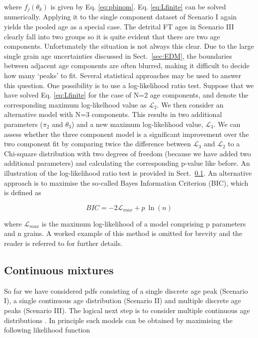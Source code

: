 \documentclass{article}
\begin{document}
where $f_j(\theta_k)$ is given by Eq. \ref{eq:pbinom}.  Eq.
\ref{eq:Lfinite} can be solved numerically. Applying it to the single
component dataset of Scenario I again yields the pooled age as a
special case. The detrital FT ages in Scenario III clearly fall into
two groups so it is quite evident that there are two age
components. Unfortunately the situation is not always this clear. Due
to the large single grain age uncertainties discussed in
Sect.~\ref{sec:EDM}, the boundaries between adjacent age components
are often blurred, making it difficult to decide how many `peaks' to
fit. Several statistical approaches may be used to answer this
question.  One possibility is to use a log-likelihood ratio
test. Suppose that we have solved Eq. \ref{eq:Lfinite} for the case of
N=2 age components, and denote the corresponding maximum log-likelhood
value as $\mathcal{L}_2$. We then consider an alternative model with
N=3 components.  This results in two additional parameters ($\pi_2$
and $\theta_3$) and a new maximum log-likelihood value,
$\mathcal{L}_3$. We can assess whether the three component model is a
significant improvement over the two component fit by comparing twice
the difference between $\mathcal{L}_3$ and $\mathcal{L}_2$ to a
Chi-square distribution with two degrees of freedom (because we have
added two additional parameters) and calculating the corresponding
p-value like before. An illustration of the log-likelihood ratio test
is provided in Sect.~\ref{sec:continuous}.  An alternative approach is
to maximise the so-called Bayes Information Criterion (BIC), which is
defined as

\begin{equation}
BIC = -2 \mathcal{L}_{max} + p ~ \ln (n)
\end{equation}

where $\mathcal{L}_{max}$ is the maximum log-likelihood of a model
comprising p parameters and n grains. A worked example of this method
is omitted for brevity and the reader is referred to
\citet[][p.91]{galbraith2005} for further details.

\subsection{Continuous mixtures}
\label{sec:continuous}

So far we have considered pdfs consisting of a single discrete age
peak (Scenario I), a single continuous age distribution (Scenario II)
and multiple discrete age peaks (Scenario III).  The logical next step
is to consider multiple continuous age distributions
\citep{jasra2006}.  In principle such models can be obtained by
maximising the following likelihood function
\end{document}
